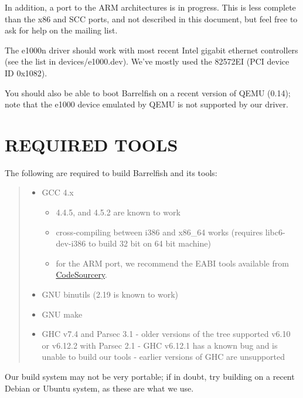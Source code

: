 In addition, a port to the ARM architectures is in progress. This is
less complete than the x86 and SCC ports, and not described in this
document, but feel free to ask for help on the mailing list.

The e1000n driver should work with most recent Intel gigabit ethernet
controllers (see the list in devices/e1000.dev). We've mostly used the
82572EI (PCI device ID 0x1082).

You should also be able to boot Barrelfish on a recent version of QEMU (0.14);
note that the e1000 device emulated by QEMU is not supported by our driver.


\section{REQUIRED TOOLS%
  \label{required-tools}%
}

The following are required to build Barrelfish and its tools:
%
\begin{quote}
%
\begin{itemize}

\item GCC 4.x
%
\begin{itemize}

\item 4.4.5, and 4.5.2 are known to work

\item cross-compiling between i386 and x86\_64 works (requires libc6-dev-i386
to build 32 bit on 64 bit machine)

\item for the ARM port, we recommend the EABI tools available from \href{http://www.codesourcery.com/sgpp/lite/arm}{CodeSourcery}.

\end{itemize}

\item GNU binutils (2.19 is known to work)

\item GNU make

\item GHC v7.4 and Parsec 3.1
- older versions of the tree supported v6.10 or v6.12.2 with Parsec 2.1
- GHC v6.12.1 has a known bug and is unable to build our tools
- earlier versions of GHC are unsupported

\end{itemize}

\end{quote}

Our build system may not be very portable; if in doubt, try building on a
recent Debian or Ubuntu system, as these are what we use.


